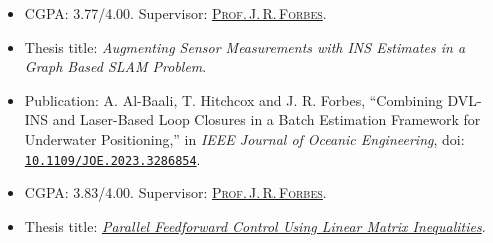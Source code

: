 \documentclass[10pt,letter]{altacv}
\begin{document}
\begin{itemize}
\item CGPA: 3.77/4.00. Supervisor: \href{https://www.mcgill.ca/mecheng/james-forbes}{\textsc{Prof.\,J.\,R.\,Forbes}}.
\item Thesis title: \emph{Augmenting Sensor Measurements with INS Estimates in a Graph Based SLAM Problem}.
\item Publication: %
  {A. Al-Baali}, {T. Hitchcox} and {J. R. Forbes}, ``Combining DVL-INS and Laser-Based Loop Closures in a Batch Estimation Framework for Underwater Positioning,'' in \emph{IEEE Journal of Oceanic Engineering}, doi: \texttt{\href{http://doi.org/10.1109/JOE.2023.3286854}{10.1109/JOE.2023.3286854}}.
\end{itemize}

\divider

\begin{itemize}
\item CGPA: 3.83/4.00. Supervisor: \href{https://www.mcgill.ca/mecheng/james-forbes}{\textsc{Prof.\,J.\,R.\,Forbes}}.
\item Thesis title: \emph{\href{https://escholarship.mcgill.ca/concern/papers/9p290g61r}{Parallel Feedforward Control Using Linear Matrix Inequalities}}.
\end{itemize}
\end{document}
